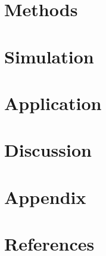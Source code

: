 \documentclass[12pt]{article}
\begin{document}

\section*{Methods}
\label{sec:meth}

\section*{Simulation}
\label{sec:sim}


\section*{Application}
\label{sec:app}

\section*{Discussion}
\label{sec:disc}

\section*{Appendix}
\label{sec:appx}

\section*{References}
\label{sec:refs}
\end{document}
